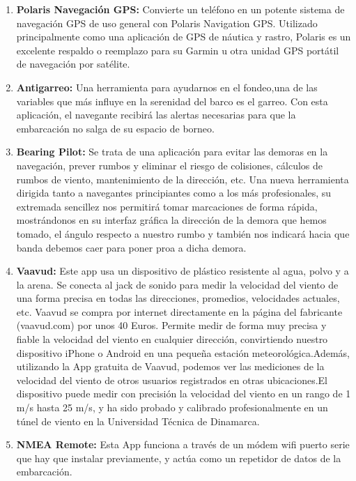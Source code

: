 \begin{enumerate}
\item \textbf{Polaris Navegación GPS:} Convierte un teléfono en un
  potente sistema de navegación GPS de uso general con Polaris
  Navigation GPS. Utilizado principalmente como una aplicación de GPS
  de náutica y rastro, Polaris es un excelente respaldo o reemplazo
  para su Garmin u otra unidad GPS portátil de navegación por
  satélite.

\item \textbf{Antigarreo:} Una herramienta para ayudarnos en el
  fondeo,una de las variables que más influye en la serenidad del
  barco es el garreo. Con esta aplicación, el navegante recibirá las
  alertas necesarias para que la embarcación no salga de su espacio de
  borneo.

\item \textbf{Bearing Pilot:} Se trata de una aplicación para evitar
  las demoras en la navegación, prever rumbos y eliminar el riesgo de
  colisiones, cálculos de rumbos de viento, mantenimiento de la
  dirección, etc. Una nueva herramienta dirigida tanto a navegantes
  principiantes como a los más profesionales, su extremada sencillez
  nos permitirá tomar marcaciones de forma rápida, mostrándonos en su
  interfaz gráfica la dirección de la demora que hemos tomado, el
  ángulo respecto a nuestro rumbo y también nos indicará hacia que
  banda debemos caer para poner proa a dicha demora.

\item \textbf{Vaavud:} Este app usa un dispositivo de plástico
  resistente al agua, polvo y a la arena. Se conecta al jack de sonido
  para medir la velocidad del viento de una forma precisa en todas las
  direcciones, promedios, velocidades actuales, etc. Vaavud se compra
  por internet directamente en la página del fabricante (vaavud.com)
  por unos 40 Euros. Permite medir de forma muy precisa y fiable la
  velocidad del viento en cualquier dirección, convirtiendo nuestro
  dispositivo iPhone o Android en una pequeña estación
  meteorológica.Además, utilizando la App gratuita de Vaavud, podemos
  ver las mediciones de la velocidad del viento de otros usuarios
  registrados en otras ubicaciones.El dispositivo puede medir con
  precisión la velocidad del viento en un rango de 1 m/s hasta 25 m/s,
  y ha sido probado y calibrado profesionalmente en un túnel de viento
  en la Universidad Técnica de Dinamarca.

\item \textbf{NMEA Remote:} Esta App funciona a través de un módem
  wifi puerto serie que hay que instalar previamente, y actúa como un
  repetidor de datos de la embarcación.
\end{enumerate}
 
